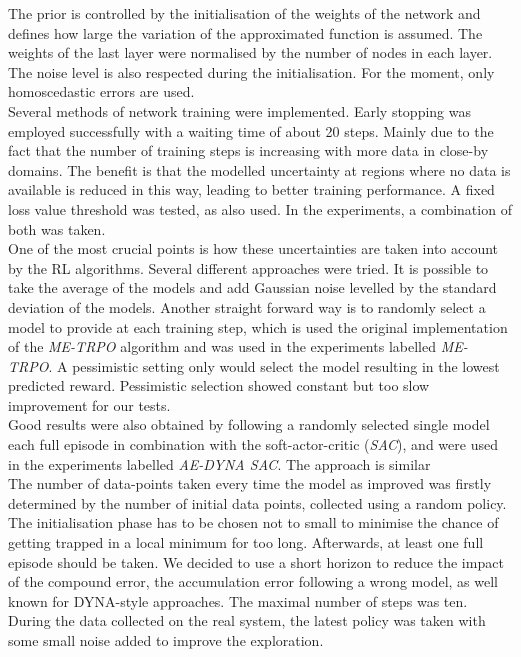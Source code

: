 \documentclass[
reprint,
amsmath,amssymb,amsfonts,clevref,
aps,
prstab,
]{revtex4-2}
\begin{document}
	 The prior is controlled by the initialisation of the weights of the network and defines how large the variation of the approximated function is assumed. The weights of the last layer were normalised by the number of nodes in each layer. The noise level is also respected during the initialisation. For the moment, only homoscedastic errors are used.\\
	  Several methods of network training were implemented. Early stopping was employed successfully with a waiting time of about 20 steps. Mainly due to the fact that the number of training steps is increasing with more data in close-by domains. The benefit is that the modelled uncertainty at regions where no data is available is reduced in this way, leading to better training performance. A fixed loss value threshold was tested, as also used. In the experiments, a combination of both was taken.\\
	One of the most crucial points is how these uncertainties are taken into account by the RL algorithms. Several different approaches were tried. It is possible to take the average of the models and add Gaussian noise levelled by the standard deviation of the models. Another straight forward way is to randomly select a model to provide at each training step, which is used the original implementation of the \emph{ME-TRPO} algorithm and was used in the experiments labelled \emph{ME-TRPO}. A pessimistic setting only would select the model resulting in the lowest predicted reward. Pessimistic selection showed constant but too slow improvement for our tests.
	\\ Good results were also obtained by following a randomly selected single model each full episode in combination with the  soft-actor-critic (\emph{SAC}), and were used in the experiments labelled \emph{AE-DYNA SAC}. The approach is similar \\
	The number of data-points taken every time the model as improved was firstly determined by the number of initial data points, collected using a random policy. The initialisation phase has to be chosen not to small to minimise the chance of getting trapped in a local minimum for too long. Afterwards, at least one full episode should be taken. We decided to use a short horizon to reduce the impact of the compound error, the accumulation error following a wrong model, as well known for DYNA-style approaches. The maximal number of steps was ten. During the data collected on the real system, the latest policy was taken with some small noise added to improve the exploration.\\
\end{document}
